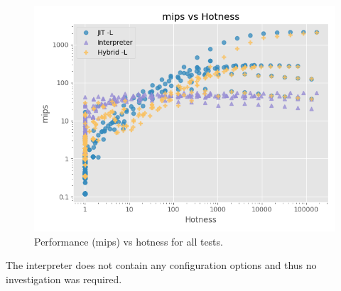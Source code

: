 \begin{figure}[H]
    \centering
    \includegraphics[scale=0.75]{output/graphs/scatter/emulators/hotness.png}
    \caption{Performance (mips) vs hotness for all tests.}
    \label{figure:emus-hotness}
\end{figure}

The interpreter does not contain any configuration options and thus no investigation was required.